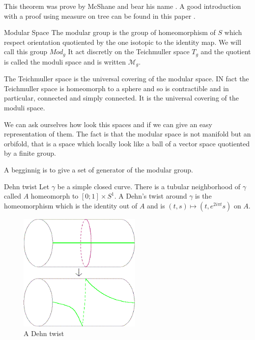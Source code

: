 This theorem was prove by McShane and bear his name \cite{Mcshane95simplegeodesics}. A good introduction with a proof using measure on tree can be found in this paper \cite{labourie:hal-01654564}.

\begin{dfnt}{Modular Space}
The modular group is the group of homeomorphism of $S$ which respect orientation quotiented by the one isotopic to the identity map. We will call this group $Mod_g$
It act discretly on the Teichmuller space $T_g$ and the quotient is called the moduli space and is written $\mathcal{M}_g$.
\end{dfnt}

The Teichmuller space is the universal covering of the modular space. IN fact the Teichmuller space is homeomorph to a sphere and so is contractible and in particular, connected and simply connected. It is the universal covering of the moduli space.

We can ask ourselves how look this spaces and if we can give an easy representation of them. The fact is that the modular space is not manifold but an orbifold, that is a space which locally look like a ball of a vector space quotiented by a finite group.


 A begginnig is to give a set of generator of the modular group.

\begin{dfnt}{Dehn twist}
Let $\gamma$ be a simple closed curve. There is a tubular neighborhood of $\gamma$ called $A$ homeomorph to $[0;1] \times S^{1}$.
A Dehn's twist around $\gamma$ is the homeomorphism which is the identity out of $A$ and is $(t,s) \mapsto (t,e^{2i \pi t} s)$ on $A$.
\end{dfnt}

\begin{figure}[!h]
\centering
\includegraphics[width=6cm]{Image/Dehn_twist.png}
\caption{A Dehn twist}
\end{figure}

